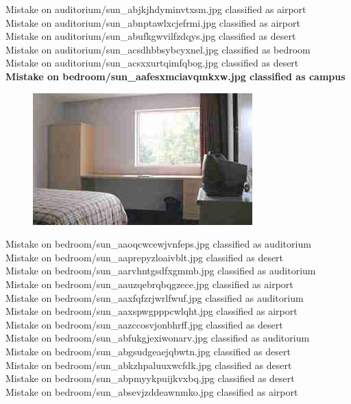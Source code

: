 \documentclass[12pt]{article}
\begin{document}
Mistake on auditorium/sun\_abjkjhdyminvtxsm.jpg classified as airport \\
Mistake on auditorium/sun\_abnptawlxcjefrmi.jpg classified as airport \\
Mistake on auditorium/sun\_abufkgwvilfzdqys.jpg classified as desert \\
Mistake on auditorium/sun\_acsdhbbsybcyxnel.jpg classified as bedroom \\
Mistake on auditorium/sun\_acsxxurtqimfqbog.jpg classified as desert \\
{\bf Mistake on bedroom/sun\_aafesxmciavqmkxw.jpg classified as campus \\}
\begin{figure}
\centering
\includegraphics[width=0.5\linewidth]{../dat/bedroom/sun_aafesxmciavqmkxw.jpg}
\end{figure}
Mistake on bedroom/sun\_aaoqcwcewjvnfeps.jpg classified as auditorium \\
Mistake on bedroom/sun\_aaprepyzloaivblt.jpg classified as desert \\
Mistake on bedroom/sun\_aarvhntgsdfxgmmb.jpg classified as auditorium \\
Mistake on bedroom/sun\_aauzqebrqbqgzece.jpg classified as airport \\
Mistake on bedroom/sun\_aaxfqfzrjwrlfwuf.jpg classified as auditorium \\
Mistake on bedroom/sun\_aaxspwgpppcwlqht.jpg classified as airport \\
Mistake on bedroom/sun\_aazccosvjonbhrff.jpg classified as desert \\
Mistake on bedroom/sun\_abfukgjexiwonarv.jpg classified as auditorium \\
Mistake on bedroom/sun\_abgsudgeaejqbwtn.jpg classified as desert \\
Mistake on bedroom/sun\_abkzhpaluuxwcfdk.jpg classified as desert \\
Mistake on bedroom/sun\_abpmyykpuijkvxbq.jpg classified as desert \\
Mistake on bedroom/sun\_absevjzddeawnmko.jpg classified as airport \\
\end{document}
